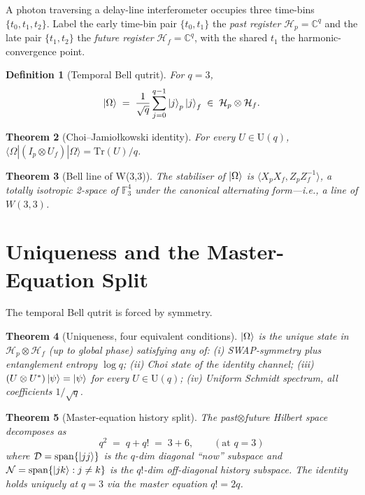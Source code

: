 \documentclass[11pt]{article}
\newtheorem{theorem}{Theorem}
\newtheorem{definition}[theorem]{Definition}
\newcommand{\CC}{\mathbb{C}}
\newcommand{\GF}[1]{\mathbb{F}_{#1}}
\begin{document}
A photon traversing a delay-line interferometer occupies three time-bins
$\{t_0, t_1, t_2\}$.  Label the early time-bin pair $\{t_0, t_1\}$ the
\emph{past register} $\mathcal H_p = \CC^q$ and the late pair $\{t_1, t_2\}$
the \emph{future register} $\mathcal H_f = \CC^q$, with the shared $t_1$
the harmonic-convergence point.

\begin{definition}[Temporal Bell qutrit]\label{def:bell}
For $q = 3$,
\begin{equation}
  \ket{\Omega} \;=\; \frac{1}{\sqrt q}\sum_{j=0}^{q-1}\ket{j}_p\ket{j}_f
  \;\in\; \mathcal H_p \otimes \mathcal H_f.
  \label{eq:bell}
\end{equation}
\end{definition}

\begin{theorem}[Choi--Jamio\l kowski identity]\label{thm:choi}
For every $U\in\mathrm{U}(q)$,
$\langle\Omega|(I_p\otimes U_f)|\Omega\rangle = \mathrm{Tr}(U)/q$.
\end{theorem}

\begin{theorem}[Bell line of W(3,3)]\label{thm:bellline}
The stabiliser of $\ket{\Omega}$ is $\langle X_p X_f, Z_p Z_f^{-1}\rangle$,
a totally isotropic 2-space of $\GF{3}^4$ under the canonical alternating
form---i.e., a \emph{line of $W(3,3)$}.
\end{theorem}

\section{Uniqueness and the Master-Equation Split}

The temporal Bell qutrit is forced by symmetry.

\begin{theorem}[Uniqueness, four equivalent conditions]\label{thm:uniqueness}
$\ket{\Omega}$ is the unique state in $\mathcal H_p\otimes\mathcal H_f$
(up to global phase) satisfying any of:
(i) SWAP-symmetry plus entanglement entropy $\log q$;
(ii) Choi state of the identity channel;
(iii) $(U\otimes U^*)\ket{\psi} = \ket{\psi}$ for every $U\in\mathrm{U}(q)$;
(iv) Uniform Schmidt spectrum, all coefficients $1/\sqrt q$.
\end{theorem}

\begin{theorem}[Master-equation history split]\label{thm:history}
The past$\otimes$future Hilbert space decomposes as
\begin{equation}
  q^2 \;=\; q + q! \;=\; 3 + 6, \qquad (\text{at }q = 3)
\end{equation}
where $\mathcal D = \mathrm{span}\{\ket{jj}\}$ is the $q$-dim diagonal
``now'' subspace and $\mathcal N = \mathrm{span}\{\ket{jk}: j\neq k\}$ is
the $q!$-dim off-diagonal history subspace.  The identity holds uniquely
at $q = 3$ via the master equation $q! = 2q$.
\end{theorem}
\end{document}
